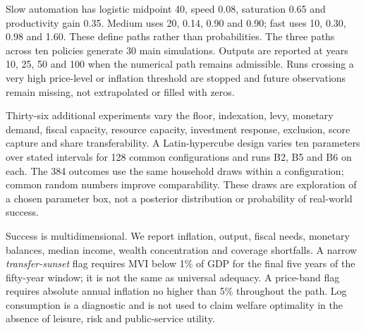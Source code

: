 Slow automation has logistic midpoint 40, speed 0.08, saturation 0.65 and productivity gain 0.35. Medium uses 20, 0.14, 0.90 and 0.90; fast uses 10, 0.30, 0.98 and 1.60. These define paths rather than probabilities. The three paths across ten policies generate 30 main simulations. Outputs are reported at years 10, 25, 50 and 100 when the numerical path remains admissible. Runs crossing a very high price-level or inflation threshold are stopped and future observations remain missing, not extrapolated or filled with zeros.

Thirty-six additional experiments vary the floor, indexation, levy, monetary demand, fiscal capacity, resource capacity, investment response, exclusion, score capture and share transferability. A Latin-hypercube design varies ten parameters over stated intervals for 128 common configurations and runs B2, B5 and B6 on each. The 384 outcomes use the same household draws within a configuration; common random numbers improve comparability. These draws are exploration of a chosen parameter box, not a posterior distribution or probability of real-world success.

Success is multidimensional. We report inflation, output, fiscal needs, monetary balances, median income, wealth concentration and coverage shortfalls. A narrow \emph{transfer-sunset} flag requires MVI below 1\% of GDP for the final five years of the fifty-year window; it is not the same as universal adequacy. A price-band flag requires absolute annual inflation no higher than 5\% throughout the path. Log consumption is a diagnostic and is not used to claim welfare optimality in the absence of leisure, risk and public-service utility.

